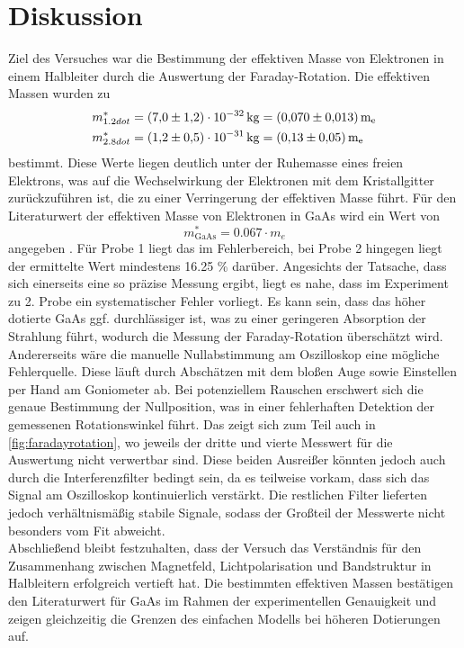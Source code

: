 \section{Diskussion}
\label{sec:Diskussion}

Ziel des Versuches war die Bestimmung der effektiven Masse von Elektronen in
einem Halbleiter durch die Auswertung der Faraday-Rotation. Die effektiven Massen
wurden zu
\begin{align*}
    m^*_{1.2dot} &= \qty{7.0+-1.2e-32}{kg} = \qty{0.07+-0.013}{m_e} \\
    m^*_{2.8dot} &= \qty{1.2+-0.5e-31}{kg} = \qty{0.13+-0.05}{m_e}
\end{align*}
bestimmt. Diese Werte liegen deutlich unter der Ruhemasse eines freien Elektrons,
was auf die Wechselwirkung der Elektronen mit dem Kristallgitter zurückzuführen ist, 
die zu einer Verringerung der effektiven Masse führt. Für den Literaturwert der
effektiven Masse von Elektronen in GaAs wird ein Wert von
\begin{equation*}
    m^*_\text{GaAs} = 0.067 \cdot m_e
\end{equation*}
angegeben \cite{effmasse}. Für Probe 1 liegt das im Fehlerbereich, bei Probe 2 
hingegen liegt der ermittelte Wert mindestens 16.25 \% darüber. Angesichts der 
Tatsache, dass sich einerseits eine so präzise Messung ergibt, liegt es nahe, dass 
im Experiment zu 2. Probe ein systematischer Fehler vorliegt. Es kann sein, dass das 
höher dotierte GaAs ggf. durchlässiger ist, was zu einer geringeren Absorption der
Strahlung führt, wodurch die Messung der Faraday-Rotation überschätzt wird. Andererseits 
wäre die manuelle Nullabstimmung am Oszilloskop eine mögliche Fehlerquelle. Diese 
läuft durch Abschätzen mit dem bloßen Auge sowie Einstellen per Hand am Goniometer 
ab. Bei potenziellem Rauschen erschwert sich die genaue Bestimmung der Nullposition,
was in einer fehlerhaften Detektion der gemessenen Rotationswinkel führt. Das zeigt 
sich zum Teil auch in \autoref{fig:faradayrotation}, wo jeweils der dritte und 
vierte Messwert für die Auswertung nicht verwertbar sind. Diese beiden Ausreißer 
könnten jedoch auch durch die Interferenzfilter bedingt sein, da es teilweise 
vorkam, dass sich das Signal am Oszilloskop kontinuierlich verstärkt. Die restlichen 
Filter lieferten jedoch verhältnismäßig stabile Signale, sodass der Großteil der
Messwerte nicht besonders vom Fit abweicht.
\\
Abschließend bleibt festzuhalten, dass der Versuch das Verständnis für den 
Zusammenhang zwischen Magnetfeld, Lichtpolarisation und Bandstruktur in Halbleitern
erfolgreich vertieft hat. Die bestimmten effektiven Massen bestätigen den
Literaturwert für GaAs im Rahmen der experimentellen Genauigkeit und zeigen 
gleichzeitig die Grenzen des einfachen Modells bei höheren Dotierungen auf.